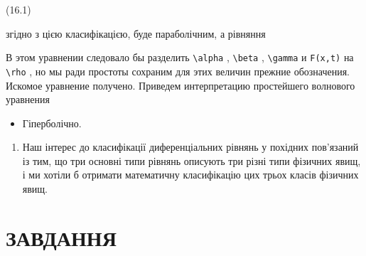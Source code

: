 \documentclass[
  ukrainian,
]{article}
\providecommand{\tightlist}{%
  \setlength{\itemsep}{0pt}\setlength{\parskip}{0pt}}
\begin{document}
(16.1)

згідно з цією класифікацією, буде параболічним, а рівняння

В этом уравнении следовало бы разделить \texttt{\textbackslash{}alpha} ,
\texttt{\textbackslash{}beta} , \texttt{\textbackslash{}gamma} и
\texttt{F(x,t)} на \texttt{\textbackslash{}rho} , но мы ради простоты
сохраним для этих величин прежние обозначения. Искомое уравнение
получено. Приведем интерпретацию простейшего волнового уравнения

\begin{itemize}
\tightlist
\item
  Гіперболічно.
\end{itemize}

\begin{enumerate}
\def\labelenumi{\arabic{enumi}.}
\setcounter{enumi}{1}
\tightlist
\item
  Наш інтерес до класифікації диференціальних рівнянь у похідних
  пов'язаний із тим, що три основні типи рівнянь описують три різні типи
  фізичних явищ, і ми хотіли б отримати математичну класифікацію цих
  трьох класів фізичних явищ.
\end{enumerate}

\section{ЗАВДАННЯ}\label{ux437ux430ux432ux434ux430ux43dux43dux44f-9}
\end{document}

